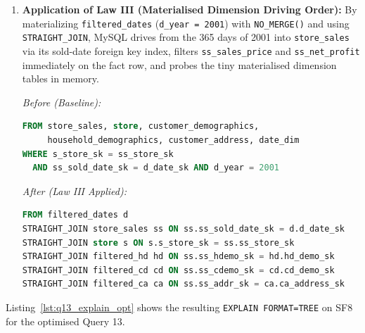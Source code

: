 \documentclass{ULBreport}
\begin{document}
\begin{enumerate}
    \item \textbf{Application of Law III (Materialised Dimension Driving Order):} By materializing \texttt{filtered\_dates} (\texttt{d\_year = 2001}) with \texttt{NO\_MERGE()} and using \texttt{STRAIGHT\_JOIN}, MySQL drives from the 365 days of 2001 into \texttt{store\_sales} via its sold-date foreign key index, filters \texttt{ss\_sales\_price} and \texttt{ss\_net\_profit} immediately on the fact row, and probes the tiny materialised dimension tables in memory.

    \textit{Before (Baseline):}
\begin{lstlisting}[language=SQL, basicstyle=\ttfamily\scriptsize, breaklines=true, frame=single]
FROM store_sales, store, customer_demographics,
     household_demographics, customer_address, date_dim
WHERE s_store_sk = ss_store_sk
  AND ss_sold_date_sk = d_date_sk AND d_year = 2001
\end{lstlisting}

    \textit{After (Law III Applied):}
\begin{lstlisting}[language=SQL, basicstyle=\ttfamily\scriptsize, breaklines=true, frame=single]
FROM filtered_dates d
STRAIGHT_JOIN store_sales ss ON ss.ss_sold_date_sk = d.d_date_sk
STRAIGHT_JOIN store s ON s.s_store_sk = ss.ss_store_sk
STRAIGHT_JOIN filtered_hd hd ON ss.ss_hdemo_sk = hd.hd_demo_sk
STRAIGHT_JOIN filtered_cd cd ON ss.ss_cdemo_sk = cd.cd_demo_sk
STRAIGHT_JOIN filtered_ca ca ON ss.ss_addr_sk = ca.ca_address_sk
\end{lstlisting}
\end{enumerate}

Listing~\ref{lst:q13_explain_opt} shows the resulting \texttt{EXPLAIN FORMAT=TREE} on SF8 for the optimised Query 13.
\end{document}
